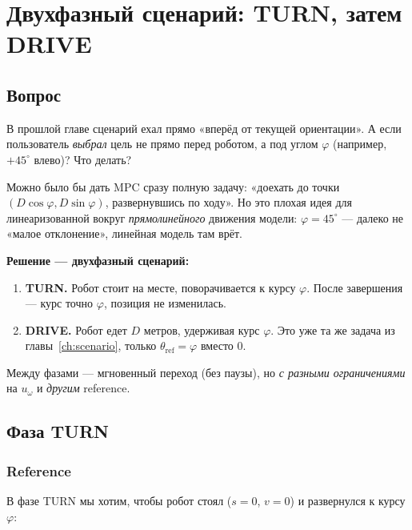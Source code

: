 \chapter{Двухфазный сценарий: TURN, затем DRIVE}
\label{ch:turn_phase}

\section{Вопрос}

В прошлой главе сценарий ехал прямо «вперёд от текущей ориентации».
А если пользователь \emph{выбрал} цель не прямо перед роботом, а
под углом $\varphi$ (например, $+45^\circ$ влево)? Что делать?

\begin{ideabox}
Можно было бы дать MPC сразу полную задачу: «доехать до точки $(D\cos\varphi,
D\sin\varphi)$, развернувшись по ходу». Но это плохая идея для линеаризованной
вокруг \emph{прямолинейного} движения модели: $\varphi = 45^\circ$ ---
далеко не «малое отклонение», линейная модель там врёт.

\textbf{Решение --- двухфазный сценарий:}
\begin{enumerate}
  \item \textbf{TURN.} Робот стоит на месте, поворачивается к курсу
        $\varphi$. После завершения --- курс точно $\varphi$, позиция
        не изменилась.
  \item \textbf{DRIVE.} Робот едет $D$ метров, удерживая курс $\varphi$.
        Это уже та же задача из главы~\ref{ch:scenario}, только
        $\theta_\text{ref} = \varphi$ вместо $0$.
\end{enumerate}
Между фазами --- мгновенный переход (без паузы), но \emph{с разными
ограничениями} на $u_\omega$ и \emph{другим} reference.
\end{ideabox}

\section{Фаза TURN}

\subsection{Reference}

В фазе TURN мы хотим, чтобы робот стоял ($s = 0$, $v = 0$) и развернулся
к курсу $\varphi$:

